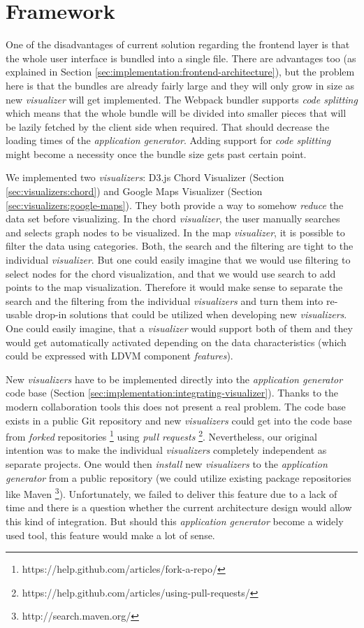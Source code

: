 \section{Framework}

One of the disadvantages of current solution regarding the frontend layer is that the whole user interface is bundled into a single file. There are advantages too (as explained in Section \ref{sec:implementation:frontend-architecture}), but the problem here is that the bundles are already fairly large and they will only grow in size as new \emph{visualizer} will get implemented. The Webpack bundler supports \emph{code splitting} which means that the whole bundle will be divided into smaller pieces that will be lazily fetched by the client side when required. That should decrease the loading times of the \emph{application generator}. Adding support for \emph{code splitting} might become a necessity once the bundle size gets past certain point.

We implemented two \emph{visualizers}: D3.js Chord Visualizer (Section \ref{sec:visualizers:chord}) and Google Maps Visualizer (Section \ref{sec:visualizers:google-maps}). They both provide a way to somehow \emph{reduce} the data set before visualizing. In the chord \emph{visualizer}, the user manually searches and selects graph nodes to be visualized. In the map \emph{visualizer}, it is possible to filter the data using categories. Both, the search and the filtering are tight to the individual \emph{visualizer}. But one could easily imagine that we would use filtering to select nodes for the chord visualization, and that we would use search to add points to the map visualization. Therefore it would make sense to separate the search and the filtering from the individual \emph{visualizers} and turn them into re-usable drop-in solutions that could be utilized when developing new \emph{visualizers}. One could easily imagine, that a \emph{visualizer} would support both of them and they would get automatically activated depending on the data characteristics (which could be expressed with LDVM component \emph{features}).

New \emph{visualizers} have to be implemented directly into the \emph{application generator} code base (Section \ref{sec:implementation:integrating-visualizer}). Thanks to the modern collaboration tools this does not present a real problem. The code base exists in a public Git repository and new \emph{visualizers} could get into the code base from \emph{forked} repositories \footnote{https://help.github.com/articles/fork-a-repo/} using \emph{pull requests} \footnote{https://help.github.com/articles/using-pull-requests/}. Nevertheless, our original intention was to make the individual \emph{visualizers} completely independent as separate projects. One would then \emph{install} new \emph{visualizers} to the \emph{application generator} from a public repository (we could utilize existing package repositories like Maven \footnote{http://search.maven.org/}). Unfortunately, we failed to deliver this feature due to a lack of time and there is a question whether the current architecture design would allow this kind of integration. But should this \emph{application generator} become a widely used tool, this feature would make a lot of sense.

